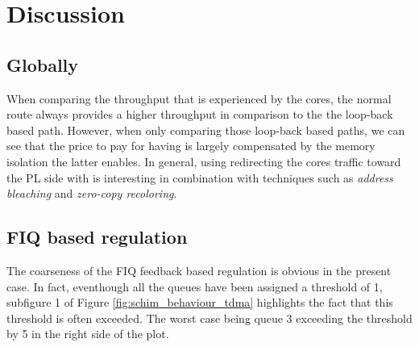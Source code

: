 \section{Discussion}
    \subsection{Globally}
      When comparing the throughput that is experienced by the cores, the normal route always provides a higher throughput in comparison to the the loop-back based path.
      However, when only comparing those loop-back based paths, we can see that the price to pay for having \schim is largely compensated by the memory isolation the latter enables.
    In general, using redirecting the cores traffic toward the PL side with \schim is interesting in combination with techniques such as  \textit{address bleaching} and \textit{zero-copy recoloring}.
    
    \subsection{FIQ based regulation}
      The coarseness of the FIQ feedback based regulation is obvious in the present case. In fact, eventhough all the queues have been assigned a threshold of 1, subfigure 1 of Figure \ref{fig:schim_behaviour_tdma} highlights the fact that this threshold is often exceeded. The worst case being queue 3 exceeding the threshold by 5 in the right side of the plot.
